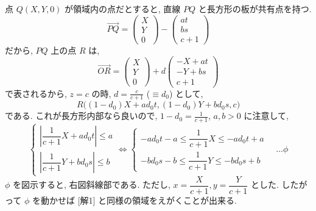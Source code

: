 \documentclass[../main.tex]{subfiles}
\begin{document}
\noindent
点 $Q(X, Y, 0)$ が領域内の点だとすると, 直線 $PQ$ と長方形の板が共有点を持つ.
\[
  \vec{PQ} =
  \begin{pmatrix} X \\ Y \\ 0
  \end{pmatrix} -
  \begin{pmatrix} at \\ bs \\ c+1
  \end{pmatrix}
\]
だから, $PQ$ 上の点 $R$ は,
\[
  \vec{OR} =
  \begin{pmatrix} X \\ Y \\ 0
  \end{pmatrix} + d
  \begin{pmatrix} -X + at \\ -Y + bs \\ c+1
  \end{pmatrix}
\]
で表されるから, $z=c$ の時, $d = \frac{c}{c+1}$ ($\equiv d_0$) として,
\[
  R\Big( (1-d_0)X + a d_0 t, (1-d_0)Y + b d_0 s, c \Big)
\]
である. これが長方形内部なら良いので, $1-d_0 = \frac{1}{c+1}$, $a, b > 0$ に注意して,
\[
  \begin{cases}
    \left| \dfrac{1}{c+1} X + a d_0 t \right| \le a \\[10pt]
    \left| \dfrac{1}{c+1} Y + b d_0 s \right| \le b
  \end{cases}
  \iff
  \begin{cases}
    -a d_0 t - a \le \dfrac{1}{c+1} X \le -a d_0 t + a \\[10pt]
    -b d_0 s - b \le \dfrac{1}{c+1} Y \le -b d_0 s + b
  \end{cases}
  \quad \dots \phi
\]
$\phi$ を図示すると, 右図斜線部である. ただし, $x = \dfrac{X}{c+1}, y = \dfrac{Y}{c+1}$ とした. したがって $\phi$ を動かせば [解1] と同様の領域をえがくことが出来る.

\begin{center}
\end{center}
\end{document}

